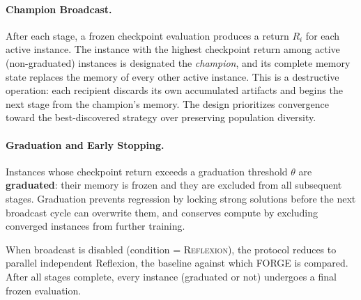 \documentclass[sigconf]{acmart}
\begin{document}
\paragraph{Champion Broadcast.}
After each stage, a frozen checkpoint evaluation produces a return $R_i$ for each active instance. The instance with the highest checkpoint return among active (non-graduated) instances is designated the \emph{champion}, and its complete memory state replaces the memory of every other active instance. This is a destructive operation: each recipient discards its own accumulated artifacts and begins the next stage from the champion's memory. The design prioritizes convergence toward the best-discovered strategy over preserving population diversity.

\paragraph{Graduation and Early Stopping.}
Instances whose checkpoint return exceeds a graduation threshold $\theta$ are \textbf{graduated}: their memory is frozen and they are excluded from all subsequent stages. Graduation prevents regression by locking strong solutions before the next broadcast cycle can overwrite them, and conserves compute by excluding converged instances from further training.

When broadcast is disabled (condition = \textsc{Reflexion}), the protocol reduces to parallel independent Reflexion, the baseline against which FORGE is compared. After all stages complete, every instance (graduated or not) undergoes a final frozen evaluation.
\end{document}
